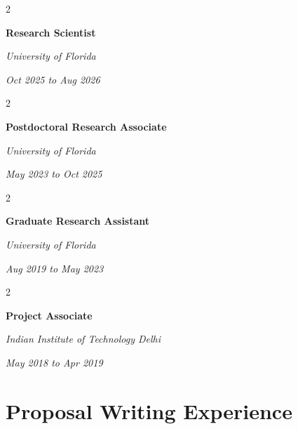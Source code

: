\documentclass[10pt, letterpaper]{article}
\newenvironment{twocolentry}[2][]{
    \onecolentry
    \def\secondColumn{#2}
    \setcolumnwidth{\fill, 4.5 cm}
    \begin{paracol}{2}
}{
    \switchcolumn \raggedleft \secondColumn
    \end{paracol}
    \endonecolentry
} %
\begin{document}
        \vspace{0.05 cm}

        \begin{twocolentry}{
            
            
        \textit{Oct 2025 to Aug 2026}}
            \textbf{Research Scientist}
            
            \textit{University of Florida}
        \end{twocolentry}



        \vspace{0.05 cm}

        \begin{twocolentry}{
            
            
        \textit{May 2023 to Oct 2025}}
            \textbf{Postdoctoral Research Associate}
            
            \textit{University of Florida}
        \end{twocolentry}



        \vspace{0.05 cm}

        \begin{twocolentry}{
            
            
        \textit{Aug 2019 to May 2023}}
            \textbf{Graduate Research Assistant}
            
            \textit{University of Florida}
        \end{twocolentry}



        \vspace{0.05 cm}

        \begin{twocolentry}{
            
            
        \textit{May 2018 to Apr 2019}}
            \textbf{Project Associate}
            
            \textit{Indian Institute of Technology Delhi}
        \end{twocolentry}


\section{Proposal Writing Experience}
\end{document}
